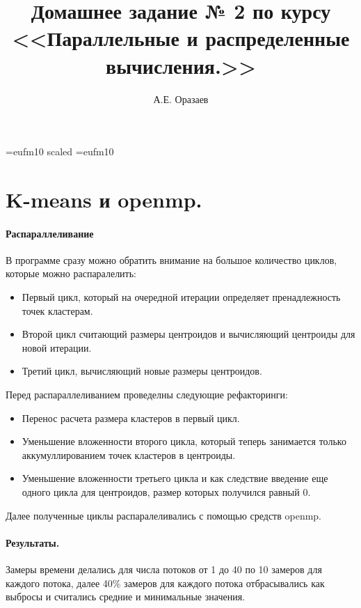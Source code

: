 \documentclass[12pt]{article}
\title{\bf Домашнее задание № 2 по курсу \\ <<Параллельные
и распределенные вычисления.>>}
\author{А.Е. Оразаев}
\date{}
\begin{document}
\voffset=-20mm
\hoffset=-12mm
\font\Got=eufm10 scaled \font\Got=eufm10

\maketitle

\section{K-means и openmp.}
\paragraph{Распараллеливание}
В программе сразу можно обратить внимание на большое количество
циклов, которые можно распаралелить:
\begin{itemize}
    \item Первый цикл, который на очередной итерации определяет
          пренадлежность точек кластерам. 
    \item Второй цикл считающий размеры центроидов и вычисляющий
          центроиды для новой итерации.
    \item Третий цикл, вычисляющий новые размеры центроидов.
\end{itemize}

Перед распараллеливанием проведелны следующие рефакторинги:
\begin{itemize}
    \item Перенос расчета размера кластеров в первый цикл.
    \item Уменьшение вложенности второго цикла, который теперь
          занимается только аккумуллированием точек кластеров
          в центроиды.

    \item Уменьшение вложенности третьего цикла и как следствие
          введение еще одного цикла для центроидов, размер которых
          получился равный 0.
\end{itemize}

Далее полученные циклы распаралеливались с помощью средств openmp.

\paragraph{Результаты.}
Замеры времени делались для числа потоков от 1 до 40 по 10 замеров
для каждого потока, далее 40\% замеров для каждого потока отбрасывались
как выбросы и считались средние и минимальные значения.
\end{document}
